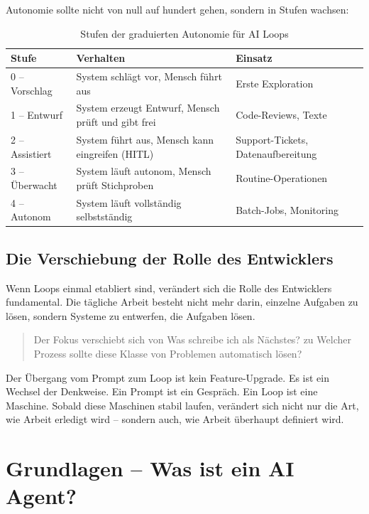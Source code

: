Autonomie sollte nicht von null auf hundert gehen, sondern in Stufen wachsen:

\begin{table}[H]
\centering
\begin{tabularx}{\linewidth}{lXl}
\toprule
\textbf{Stufe} & \textbf{Verhalten} & \textbf{Einsatz} \\
\midrule
0 -- Vorschlag & System schlägt vor, Mensch führt aus & Erste Exploration \\
1 -- Entwurf & System erzeugt Entwurf, Mensch prüft und gibt frei & Code-Reviews, Texte \\
2 -- Assistiert & System führt aus, Mensch kann eingreifen (HITL) & Support-Tickets, Datenaufbereitung \\
3 -- Überwacht & System läuft autonom, Mensch prüft Stichproben & Routine-Operationen \\
4 -- Autonom & System läuft vollständig selbstständig & Batch-Jobs, Monitoring \\
\bottomrule
\end{tabularx}
\caption{Stufen der graduierten Autonomie für AI Loops}
\label{tab:autonomiestufen}
\end{table}

\subsection{Die Verschiebung der Rolle des Entwicklers}

Wenn Loops einmal etabliert sind, verändert sich die Rolle des Entwicklers fundamental. Die tägliche Arbeit besteht nicht mehr darin, einzelne Aufgaben zu lösen, sondern Systeme zu entwerfen, die Aufgaben lösen.

\begin{quote}
Der Fokus verschiebt sich von \glqq Was schreibe ich als Nächstes?\grqq{} zu \glqq Welcher Prozess sollte diese Klasse von Problemen automatisch lösen?\grqq{}
\end{quote}

Der Übergang vom Prompt zum Loop ist kein Feature-Upgrade. Es ist ein Wechsel der Denkweise. Ein Prompt ist ein Gespräch. Ein Loop ist eine Maschine. Sobald diese Maschinen stabil laufen, verändert sich nicht nur die Art, wie Arbeit erledigt wird -- sondern auch, wie Arbeit überhaupt definiert wird.

\section{Grundlagen -- Was ist ein AI Agent?}

